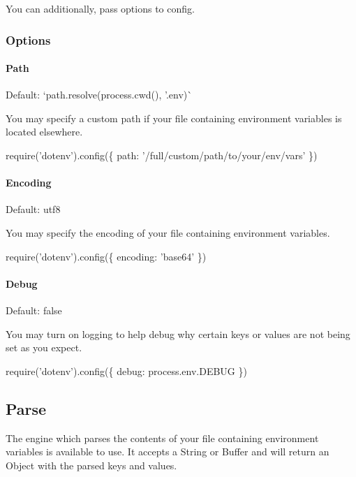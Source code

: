 You can additionally, pass options to {\ttfamily config}.

\subsubsection*{Options}

\paragraph*{Path}

Default\+: `path.\+resolve(process.\+cwd(), '.env\textquotesingle{})\`{}

You may specify a custom path if your file containing environment variables is located elsewhere.


\begin{DoxyCode}
require('dotenv').config(\{ path: '/full/custom/path/to/your/env/vars' \})
\end{DoxyCode}


\paragraph*{Encoding}

Default\+: {\ttfamily utf8}

You may specify the encoding of your file containing environment variables.


\begin{DoxyCode}
require('dotenv').config(\{ encoding: 'base64' \})
\end{DoxyCode}


\paragraph*{Debug}

Default\+: {\ttfamily false}

You may turn on logging to help debug why certain keys or values are not being set as you expect.


\begin{DoxyCode}
require('dotenv').config(\{ debug: process.env.DEBUG \})
\end{DoxyCode}


\subsection*{Parse}

The engine which parses the contents of your file containing environment variables is available to use. It accepts a String or Buffer and will return an Object with the parsed keys and values.


